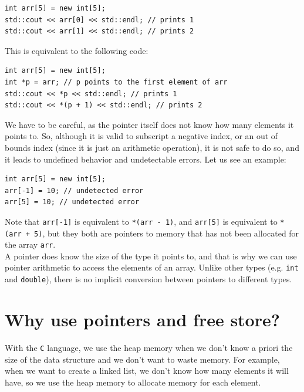 \begin{lstlisting}
int arr[5] = new int[5];
std::cout << arr[0] << std::endl; // prints 1
std::cout << arr[1] << std::endl; // prints 2
\end{lstlisting}

This is equivalent to the following code:\\

\begin{lstlisting}
int arr[5] = new int[5];
int *p = arr; // p points to the first element of arr
std::cout << *p << std::endl; // prints 1
std::cout << *(p + 1) << std::endl; // prints 2
\end{lstlisting}

We have to be careful, as the pointer itself does not know how many elements it points to. So, although it is valid to
subscript a negative index, or an out of bounds index (since it is just an arithmetic operation), it is not safe to do so, and
it leads to undefined behavior and undetectable errors. Let us see an example:\\

\begin{lstlisting}
int arr[5] = new int[5];
arr[-1] = 10; // undetected error
arr[5] = 10; // undetected error
\end{lstlisting}

Note that \texttt{arr[-1]} is equivalent to \texttt{*(arr - 1)}, and \texttt{arr[5]} is equivalent to \texttt{*(arr + 5)}, but
they both are pointers to memory that has not been allocated for the array \texttt{arr}.\\

A pointer does know the size of the type it points to, and that is why we can use pointer arithmetic to access the elements of an array.
Unlike other types (e.g. \texttt{int} and \texttt{double}), there is no implicit conversion between pointers to different types.

\section{Why use pointers and free store?}

With the \texttt{C} language, we use the heap memory when we don't know a priori the size of the data structure and 
we don't want to waste memory. For example, when we want to create a linked list, we don't know how many elements
it will have, so we use the heap memory to allocate memory for each element.\\

